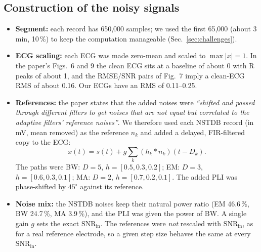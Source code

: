 \documentclass[11pt,a4paper]{article}
\newcommand{\snrin}{\mathrm{SNR}_\mathrm{in}}
\begin{document}
\subsection{Construction of the noisy signals}
\begin{itemize}
  \item \textbf{Segment:} each record has 650{,}000 samples; we used the first 65{,}000 (about 3\,min, 10\,\%) to
        keep the computation manageable (Sec.~\ref{sec:challenges}).
  \item \textbf{ECG scaling:} each ECG was made zero-mean and scaled to $\max|x|=1$. In the paper's Figs.~6 and 9 the
        clean ECG sits at a baseline of about 0 with R peaks of about 1, and the RMSE/SNR pairs of Fig.~7 imply a
        clean-ECG RMS of about 0.16. Our ECGs have an RMS of 0.11--0.25.
  \item \textbf{References:} the paper states that the added noises were \emph{``shifted and passed through different
        filters to get noises that are not equal but correlated to the adaptive filters' reference noises''}. We
        therefore used each NSTDB record (in mV, mean removed) as the reference $n_k$ and added a delayed, FIR-filtered
        copy to the ECG:
        \begin{equation}
          x(t)=s(t)+g\sum_k (h_k * n_k)(t-D_k).
        \end{equation}
        The paths were BW: $D=5$, $h=[0.5,0.3,0.2]$; EM: $D=3$, $h=[0.6,0.3,0.1]$; MA: $D=2$, $h=[0.7,0.2,0.1]$. The
        added PLI was phase-shifted by $45^\circ$ against its reference.
  \item \textbf{Noise mix:} the NSTDB noises keep their natural power ratio (EM 46.6\,\%, BW 24.7\,\%, MA 3.9\,\%),
        and the PLI was given the power of BW. A single gain $g$ sets the exact $\snrin$. The references were
        \emph{not} rescaled with $\snrin$, as for a real reference electrode, so a given step size behaves the same at
        every $\snrin$.
\end{itemize}
\end{document}
